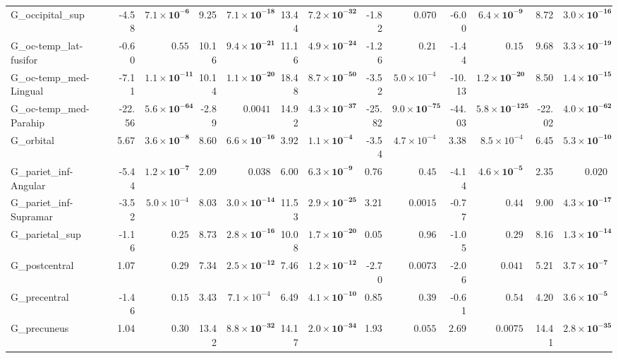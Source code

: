 {\begin{longtable}{llrrrrrrrrrrrr}
G\_occipital\_sup &  & -4.58 & $\mathbf{7.1{\times}10^{-6}}$ & 9.25 & $\mathbf{7.1{\times}10^{-18}}$ & 13.44 & $\mathbf{7.2{\times}10^{-32}}$ & -1.82 & $0.070$ & -6.00 & $\mathbf{6.4{\times}10^{-9}}$ & 8.72 & $\mathbf{3.0{\times}10^{-16}}$ \\
G\_oc-temp\_lat-fusifor &  & -0.60 & $0.55$ & 10.16 & $\mathbf{9.4{\times}10^{-21}}$ & 11.16 & $\mathbf{4.9{\times}10^{-24}}$ & -1.26 & $0.21$ & -1.44 & $0.15$ & 9.68 & $\mathbf{3.3{\times}10^{-19}}$ \\
G\_oc-temp\_med-Lingual &  & -7.11 & $\mathbf{1.1{\times}10^{-11}}$ & 10.14 & $\mathbf{1.1{\times}10^{-20}}$ & 18.48 & $\mathbf{8.7{\times}10^{-50}}$ & -3.52 & $5.0{\times}10^{-4}$ & -10.13 & $\mathbf{1.2{\times}10^{-20}}$ & 8.50 & $\mathbf{1.4{\times}10^{-15}}$ \\
G\_oc-temp\_med-Parahip &  & -22.56 & $\mathbf{5.6{\times}10^{-64}}$ & -2.89 & $0.0041$ & 14.92 & $\mathbf{4.3{\times}10^{-37}}$ & -25.82 & $\mathbf{9.0{\times}10^{-75}}$ & -44.03 & $\mathbf{5.8{\times}10^{-125}}$ & -22.02 & $\mathbf{4.0{\times}10^{-62}}$ \\
G\_orbital &  & 5.67 & $\mathbf{3.6{\times}10^{-8}}$ & 8.60 & $\mathbf{6.6{\times}10^{-16}}$ & 3.92 & $\mathbf{1.1{\times}10^{-4}}$ & -3.54 & $4.7{\times}10^{-4}$ & 3.38 & $8.5{\times}10^{-4}$ & 6.45 & $\mathbf{5.3{\times}10^{-10}}$ \\
G\_pariet\_inf-Angular &  & -5.44 & $\mathbf{1.2{\times}10^{-7}}$ & 2.09 & $0.038$ & 6.00 & $\mathbf{6.3{\times}10^{-9}}$ & 0.76 & $0.45$ & -4.14 & $\mathbf{4.6{\times}10^{-5}}$ & 2.35 & $0.020$ \\
G\_pariet\_inf-Supramar &  & -3.52 & $5.0{\times}10^{-4}$ & 8.03 & $\mathbf{3.0{\times}10^{-14}}$ & 11.53 & $\mathbf{2.9{\times}10^{-25}}$ & 3.21 & $0.0015$ & -0.77 & $0.44$ & 9.00 & $\mathbf{4.3{\times}10^{-17}}$ \\
G\_parietal\_sup &  & -1.16 & $0.25$ & 8.73 & $\mathbf{2.8{\times}10^{-16}}$ & 10.08 & $\mathbf{1.7{\times}10^{-20}}$ & 0.05 & $0.96$ & -1.05 & $0.29$ & 8.16 & $\mathbf{1.3{\times}10^{-14}}$ \\
G\_postcentral &  & 1.07 & $0.29$ & 7.34 & $\mathbf{2.5{\times}10^{-12}}$ & 7.46 & $\mathbf{1.2{\times}10^{-12}}$ & -2.70 & $0.0073$ & -2.06 & $0.041$ & 5.21 & $\mathbf{3.7{\times}10^{-7}}$ \\
G\_precentral &  & -1.46 & $0.15$ & 3.43 & $7.1{\times}10^{-4}$ & 6.49 & $\mathbf{4.1{\times}10^{-10}}$ & 0.85 & $0.39$ & -0.61 & $0.54$ & 4.20 & $\mathbf{3.6{\times}10^{-5}}$ \\
G\_precuneus &  & 1.04 & $0.30$ & 13.42 & $\mathbf{8.8{\times}10^{-32}}$ & 14.17 & $\mathbf{2.0{\times}10^{-34}}$ & 1.93 & $0.055$ & 2.69 & $0.0075$ & 14.41 & $\mathbf{2.8{\times}10^{-35}}$ \\

\end{longtable}}
